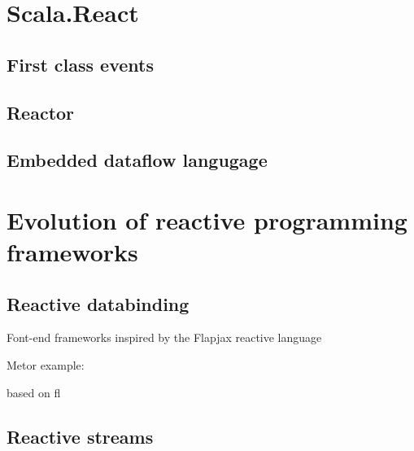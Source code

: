 \documentclass[acmtoc, authorversion]{acmart}
\begin{document}
\section{Scala.React}

\subsection{First class events}

\subsection{Reactor}

\subsection{Embedded dataflow langugage}

\section{Evolution of reactive programming frameworks}

\subsection{Reactive databinding}

Font-end frameworks inspired by the Flapjax reactive language~\cite{Meyerovich:2009}

Metor example: ~\cite{hochhaus2016meteor}

based on fl

\subsection{Reactive streams}



\end{document}
